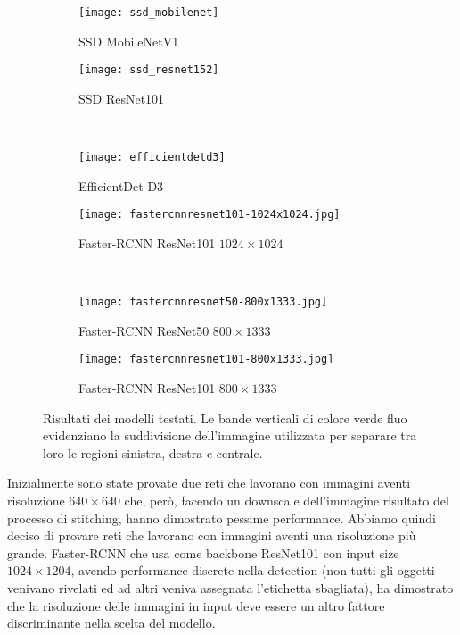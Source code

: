 \begin{figure}[t]
    \centering
    \hfill
    \begin{subfigure}[b]{0.49\textwidth}
        \centering
        \texttt{[image: ssd\_mobilenet]}
        \caption{SSD MobileNetV1}
    \end{subfigure}
    \hfill
    \begin{subfigure}[b]{0.49\textwidth}
        \centering
        \texttt{[image: ssd\_resnet152]}
        \caption{SSD ResNet101}
    \end{subfigure}
    \hfill \\
    \hfill
    \begin{subfigure}[b]{0.49\textwidth}
        \centering
        \texttt{[image: efficientdetd3]}
        \caption{EfficientDet D3}
    \end{subfigure}
    \hfill
    \begin{subfigure}[b]{0.49\textwidth}
        \centering
        \texttt{[image: fastercnnresnet101-1024x1024.jpg]}
        \caption{Faster-RCNN ResNet101 $1024\times 1024$}
    \end{subfigure}
    \hfill \\
    \hfill
    \begin{subfigure}[b]{0.49\textwidth}
        \centering
        \texttt{[image: fastercnnresnet50-800x1333.jpg]}
        \caption{Faster-RCNN ResNet50 $800\times 1333$}
    \end{subfigure}
    \hfill
    \begin{subfigure}[b]{0.49\textwidth}
        \centering
        \texttt{[image: fastercnnresnet101-800x1333.jpg]}
        \caption{Faster-RCNN ResNet101 $800\times 1333$}
    \end{subfigure}
    \hfill
    \caption{Risultati dei modelli testati. Le bande verticali di colore verde fluo evidenziano la suddivisione dell’immagine utilizzata per separare tra loro le regioni sinistra, destra e centrale.}
\end{figure}

Inizialmente sono state provate due reti che lavorano con immagini aventi risoluzione $640 \times 640$ che, però, facendo un downscale dell’immagine risultato del processo di stitching, hanno dimostrato pessime performance.
Abbiamo quindi deciso di provare reti che lavorano con immagini aventi una risoluzione più grande. Faster-RCNN che usa come backbone ResNet101 con input size $1024 \times 1204$, avendo performance discrete nella detection (non tutti gli oggetti venivano rivelati ed ad altri veniva assegnata l’etichetta sbagliata), ha dimostrato che la risoluzione delle immagini in input deve essere un altro fattore discriminante nella scelta del modello.

